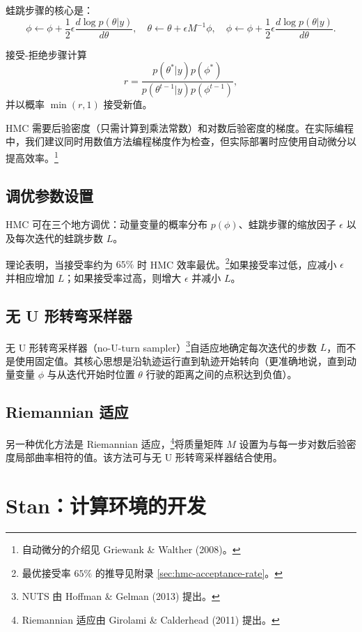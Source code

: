 蛙跳步骤的核心是：
\[
\phi \gets \phi + \frac{1}{2} \epsilon \frac{d \log p(\theta | y)}{d \theta}, \quad
\theta \gets \theta + \epsilon M^{-1} \phi, \quad
\phi \gets \phi + \frac{1}{2} \epsilon \frac{d \log p(\theta | y)}{d \theta}.
\]

接受-拒绝步骤计算
\[
r = \frac{p(\theta^* | y) p(\phi^*)}{p(\theta^{t-1} | y) p(\phi^{t-1})},
\]
并以概率 $\min(r, 1)$ 接受新值。

\begin{Remark}
  HMC 需要后验密度（只需计算到乘法常数）和对数后验密度的梯度。在实际编程中，我们建议同时用数值方法编程梯度作为检查，但实际部署时应使用自动微分以提高效率。\footnote{自动微分的介绍见 Griewank \& Walther (2008)。}
\end{Remark}

\subsection{调优参数设置}

HMC 可在三个地方调优：动量变量的概率分布 $p(\phi)$、蛙跳步骤的缩放因子 $\epsilon$ 以及每次迭代的蛙跳步数 $L$。

理论表明，当接受率约为 $65\%$ 时 HMC 效率最优。\footnote{最优接受率 $65\%$ 的推导见附录 \cref{sec:hmc-acceptance-rate}。}如果接受率过低，应减小 $\epsilon$ 并相应增加 $L$；如果接受率过高，则增大 $\epsilon$ 并减小 $L$。

\subsection{无 U 形转弯采样器}

无 U 形转弯采样器（no-U-turn sampler）\footnote{NUTS 由 Hoffman \& Gelman (2013) 提出。}自适应地确定每次迭代的步数 $L$，而不是使用固定值。其核心思想是沿轨迹运行直到轨迹开始转向（更准确地说，直到动量变量 $\phi$ 与从迭代开始时位置 $\theta$ 行驶的距离之间的点积达到负值）。

\subsection{Riemannian 适应}

另一种优化方法是 Riemannian 适应，\footnote{Riemannian 适应由 Girolami \& Calderhead (2011) 提出。}将质量矩阵 $M$ 设置为与每一步对数后验密度局部曲率相符的值。该方法可与无 U 形转弯采样器结合使用。

\section{Stan：计算环境的开发}

